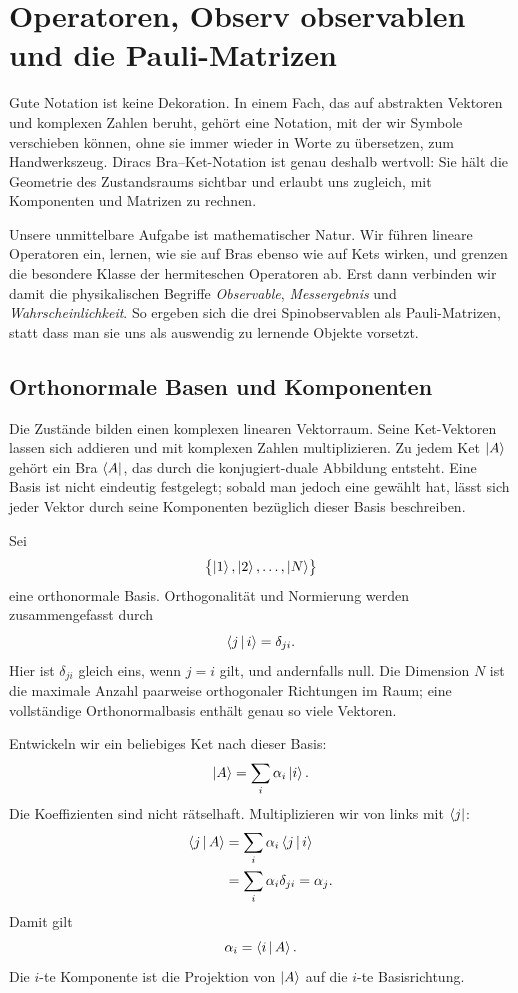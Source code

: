 \chapter{Operatoren, Observ observablen und die Pauli-Matrizen}

Gute Notation ist keine Dekoration. In einem Fach, das auf abstrakten Vektoren und komplexen Zahlen beruht, gehört eine Notation, mit der wir Symbole verschieben können, ohne sie immer wieder in Worte zu übersetzen, zum Handwerkszeug. Diracs Bra--Ket-Notation ist genau deshalb wertvoll: Sie hält die Geometrie des Zustandsraums sichtbar und erlaubt uns zugleich, mit Komponenten und Matrizen zu rechnen.

Unsere unmittelbare Aufgabe ist mathematischer Natur. Wir führen lineare Operatoren ein, lernen, wie sie auf Bras ebenso wie auf Kets wirken, und grenzen die besondere Klasse der hermiteschen Operatoren ab. Erst dann verbinden wir damit die physikalischen Begriffe \emph{Observable}, \emph{Messergebnis} und \emph{Wahrscheinlichkeit}. So ergeben sich die drei Spinobservablen als Pauli-Matrizen, statt dass man sie uns als auswendig zu lernende Objekte vorsetzt.

\section{Orthonormale Basen und Komponenten}

Die Zustände bilden einen komplexen linearen Vektorraum. Seine Ket-Vektoren lassen sich addieren und mit komplexen Zahlen multiplizieren. Zu jedem Ket \(\left\lvert A\right\rangle\) gehört ein Bra \(\left\langle A\right\rvert\), das durch die konjugiert-duale Abbildung entsteht. Eine Basis ist nicht eindeutig festgelegt; sobald man jedoch eine gewählt hat, lässt sich jeder Vektor durch seine Komponenten bezüglich dieser Basis beschreiben.

Sei
\[
\bigl\{\left\lvert1\right\rangle,\left\lvert2\right\rangle,\ldots,\left\lvert N\right\rangle\bigr\}
\]
eine orthonormale Basis. Orthogonalität und Normierung werden zusammengefasst durch
\begin{equation}
\left\langle j\,\middle|\,i\right\rangle=\delta_{ji}.
\label{eq:orthonormal-basis}
\end{equation}
Hier ist \(\delta_{ji}\) gleich eins, wenn \(j=i\) gilt, und andernfalls null. Die Dimension \(N\) ist die maximale Anzahl paarweise orthogonaler Richtungen im Raum; eine vollständige Orthonormalbasis enthält genau so viele Vektoren.

Entwickeln wir ein beliebiges Ket nach dieser Basis:
\begin{equation}
\left\lvert A\right\rangle=\sum_i \alpha_i\left\lvert i\right\rangle.
\label{eq:ket-expansion}
\end{equation}
Die Koeffizienten sind nicht rätselhaft. Multiplizieren wir von links mit \(\left\langle j\right\rvert\):
\begin{align}
\left\langle j\,\middle|\,A\right\rangle
 &=\sum_i\alpha_i\left\langle j\,\middle|\,i\right\rangle \\
 &=\sum_i\alpha_i\delta_{ji}
 =\alpha_j.
\end{align}
Damit gilt
\begin{equation}
\alpha_i=\left\langle i\,\middle|\,A\right\rangle.
\label{eq:components-inner-products}
\end{equation}
Die \(i\)-te Komponente ist die Projektion von \(\left\lvert A\right\rangle\) auf die \(i\)-te Basisrichtung.

